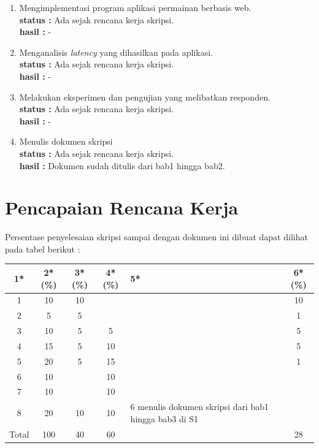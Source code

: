 \documentclass[a4paper,twoside]{article}
\begin{document}
\begin{enumerate}
		\item Mengimplementasi program aplikasi permainan berbasis web. \\
		{\bf status :} Ada sejak rencana kerja skripsi.\\
		{\bf hasil :} -
		

		\item Menganalisis \textit{latency} yang dihasilkan pada aplikasi.\\
		{\bf status :} Ada sejak rencana kerja skripsi.\\
		{\bf hasil :} -

		\item Melakukan eksperimen dan pengujian yang melibatkan responden.\\
		{\bf status :} Ada sejak rencana kerja skripsi.\\
		{\bf hasil :} -

		\item Menulis dokumen skripsi\\
		{\bf status :} Ada sejak rencana kerja skripsi.\\
		{\bf hasil :} Dokumen sudah ditulis dari bab1 hingga bab2.
		

	\end{enumerate}

%


\section{Pencapaian Rencana Kerja}
Persentase penyelesaian skripsi sampai dengan dokumen ini dibuat dapat dilihat pada tabel berikut :

\begin{center}
  \begin{tabular}{ | c | c | c | c | l | c |}
    \hline
    1*  & 2*(\%) & 3*(\%) & 4*(\%) &5* &6*(\%)\\ \hline \hline
    1   & 10  & 10  &  &  & 10 \\ \hline
    2   & 5 & 5  &   &  & 1 \\ \hline
    3   & 10  & 5  & 5 &  & 5 \\ \hline
    4   & 15  & 5  &  10 & & 5 \\ \hline
    5   & 20  & 5  & 15 & & 1 \\ \hline
    6   & 10 &   & 10  &  & \\\hline
    7   & 10  &   & 10 &  &  \\ \hline
    8   & 20  & 10 & 10  & 6 {\footnotesize menulis dokumen skripsi dari bab1 hingga bab3 di S1}  &\\ \hline
    Total  & 100  & 40  & 60 &  & 28\\ \hline
                          \end{tabular}
\end{center}
\end{document}
